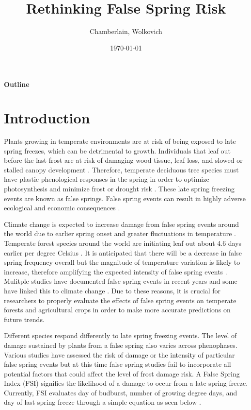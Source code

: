 \documentclass{article}\usepackage[]{graphicx}\usepackage[]{color}
\begin{document}
\title{Rethinking False Spring Risk}
\author{Chamberlain, Wolkovich}
\date{\today}
\maketitle 

\renewcommand{\thetable}{\arabic{table}}
\renewcommand{\thefigure}{\arabic{figure}}
\renewcommand{\labelitemi}{$-$}

\begin{center}
\LARGE\textbf{Outline}
\end{center}
\section{Introduction}
Plants growing in temperate environments are at risk of being exposed to late spring freezes, which can be detrimental to growth. Individuals that leaf out before the last frost are at risk of damaging wood tissue, leaf loss, and slowed or stalled canopy development \citep{Gu2008, Hufkens2012}. Therefore, temperate deciduous tree species must have plastic phenological responses in the spring in order to optimize photosynthesis and minimize frost or drought risk \citep{Polgar2011}. These late spring freezing events are known as false springs. False spring events can result in highly adverse ecological and economic consequences \citep{Ault2013, Knudson2012}.

Climate change is expected to increase damage from false spring events around the world due to earlier spring onset and greater fluctuations in temperature \citep{Martin2010, Inouye2008, Cannell1986}. Temperate forest species around the world are initiating leaf out about 4.6 days earlier per degree Celsius \citep{Polgar2014, Wolkovich2012}. It is anticipated that there will be a decrease in false spring frequency overall but the magnitude of temperature variation is likely to increase, therefore amplifying the expected intensity of false spring events \citep{Allstadt2015, Kodra2011}. Mulitple studies have documented false spring events in recent years \citep{Augspurger2013, Knudson2012, Augspurger2009, Gu2008} and some have linked this to climate change \citep{Muffler2016, Xin2016, Allstadt2015, Ault2013}. Due to these reasons, it is crucial for researchers to properly evaluate the effects of false spring events on temperate forests and agricultural crops in order to make more accurate predictions on future trends.

Different species respond differently to late spring freezing events. The level of damage sustained by plants from a false spring also varies across phenophases. Various studies have assessed the risk of damage or the intensity of particular false spring events but at this time false spring studies fail to incorporate all potential factors that could affect the level of frost damage risk. A False Spring Index (FSI) signifies the likelihood of a damage to occur from a late spring freeze. Currently, FSI evaluates day of budburst, number of growing degree days, and day of last spring freeze through a simple equation as seen below \citep{Marino2011}. 
\end{document}
